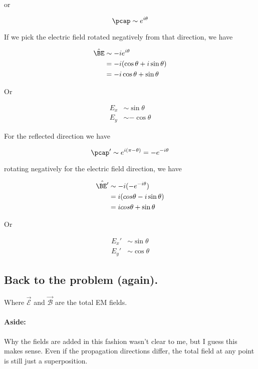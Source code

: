 or

\begin{equation}\label{eqn:relativisticElectrodynamicsT9:n}
\pcap \sim e^{i\theta}
\end{equation}

If we pick the electric field rotated negatively from that direction, we have

\begin{align*}
\hat{\BE} 
&\sim -i e^{i \theta} \\
&= -i (\cos\theta + i \sin\theta) \\
&= -i \cos\theta + \sin\theta
\end{align*}

Or

\begin{align}\label{eqn:relativisticElectrodynamicsT9:n}
E_x &\sim \sin\theta \\
E_y &\sim -\cos\theta
\end{align}

For the reflected direction we have

\begin{equation}\label{eqn:relativisticElectrodynamicsT9:n}
\pcap' \sim e^{i (\pi - \theta)} = - e^{-i \theta}
\end{equation}

rotating negatively for the electric field direction, we have

\begin{align*}
\hat{\BE'} 
&\sim -i (- e^{-i\theta} ) \\
&= i(cos\theta - i\sin\theta) \\
&= i cos\theta + \sin\theta
\end{align*}

Or

\begin{align}\label{eqn:relativisticElectrodynamicsT9:n}
E_x' &\sim \sin\theta \\
E_y' &\sim \cos\theta 
\end{align}

\subsection{Back to the problem (again).}

Where $\vec{\mathcal{E}}$ and $\vec{\mathcal{B}}$ are the total EM fields.

\paragraph{Aside:} Why the fields are added in this fashion wasn't clear to me, but I guess this makes sense.  Even if the propagation directions differ, the total field at any point is still just a superposition.

